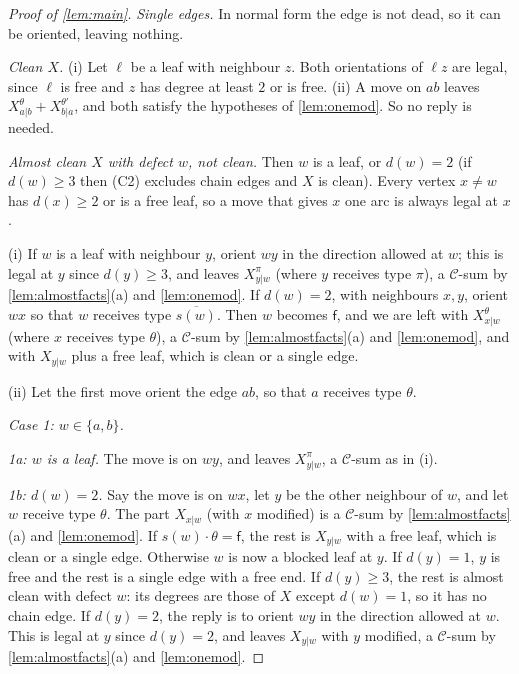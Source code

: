 \documentclass[11pt]{amsart}
\theoremstyle{definition}
\theoremstyle{remark}
\newcommand{\sff}{\mathsf{f}}
\begin{document}
\begin{proof}[Proof of \cref{lem:main}]
\emph{Single edges.} In normal form the edge is not dead, so it can be oriented, leaving nothing.

\emph{Clean $X$.} (i) Let $\ell$ be a leaf with neighbour $z$. Both orientations of $\ell z$ are
legal, since $\ell$ is free and $z$ has degree at least $2$ or is free. (ii) A move on $ab$ leaves
$X_{a|b}^\theta+X_{b|a}^{\theta'}$, and both satisfy the hypotheses of \cref{lem:onemod}. So no reply
is needed.

\emph{Almost clean $X$ with defect $w$, not clean.} Then $w$ is a leaf, or $d(w)=2$ (if
$d(w)\ge3$ then (C2) excludes chain edges and $X$ is clean). Every vertex $x\ne w$ has $d(x)\ge2$
or is a free leaf, so a move that gives $x$ one arc is always legal at $x$.

(i) If $w$ is a leaf with neighbour $y$, orient $wy$ in the direction allowed at $w$; this is legal
at $y$ since $d(y)\ge3$, and leaves $X_{y|w}^{\pi}$ (where $y$ receives type $\pi$), a $\mathcal C$-sum by
\cref{lem:almostfacts}(a) and \cref{lem:onemod}. If $d(w)=2$, with neighbours $x,y$, orient $wx$
so that $w$ receives type $\overline{s(w)}$. Then $w$ becomes $\sff$, and we are left with
$X_{x|w}^{\theta}$ (where $x$ receives type $\theta$), a $\mathcal C$-sum by \cref{lem:almostfacts}(a) and \cref{lem:onemod}, and with
$X_{y|w}$ plus a free leaf, which is clean or a single edge.

(ii) Let the first move orient the edge $ab$, so that $a$ receives type $\theta$.

\smallskip\noindent\emph{Case 1: $w\in\{a,b\}$.}

\emph{1a: $w$ is a leaf.} The move is on $wy$, and leaves $X_{y|w}^\pi$, a $\mathcal C$-sum as in (i).

\emph{1b: $d(w)=2$.} Say the move is on $wx$, let $y$ be the other neighbour of $w$, and let $w$
receive type $\theta$. The part $X_{x|w}$ (with $x$ modified) is a $\mathcal C$-sum by
\cref{lem:almostfacts}(a) and \cref{lem:onemod}. If $s(w)\cdot\theta=\sff$, the rest is $X_{y|w}$
with a free leaf, which is clean or a single edge. Otherwise $w$ is now a blocked leaf at $y$.
If $d(y)=1$, $y$ is free and the rest is a single edge with a free end. If $d(y)\ge3$, the rest
is almost clean with defect $w$: its degrees are those of $X$ except $d(w)=1$, so it has no chain
edge. If $d(y)=2$, the reply is to orient $wy$ in the direction allowed at $w$. This is legal at
$y$ since $d(y)=2$, and leaves $X_{y|w}$ with $y$ modified, a $\mathcal C$-sum by
\cref{lem:almostfacts}(a) and \cref{lem:onemod}.


\end{proof}
\end{document}

